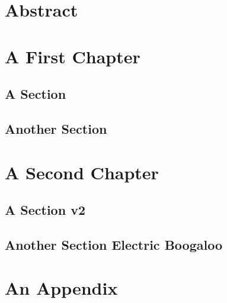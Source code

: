 \documentclass[a4paper, twoside]{report}
\begin{document}
    \lipsum[1]

\clearpage

{ \hypersetup{hidelinks} \tableofcontents {} }

\setcounter{page}{1}
\chapter*{Abstract}
\label{chap:abstract}
    \lipsum[1-2]

\chapter{A First Chapter}

    \lipsum[1]
    \section{A Section}
        \lipsum
    \section{Another Section}
        \lipsum

\chapter{A Second Chapter}

    \lipsum[1]
    \section{A Section v2}
        \lipsum
    \section{Another Section Electric Boogaloo}
        \lipsum






\appendix
\appendixpage
\addappheadtotoc

\chapter{An Appendix}
\end{document}
